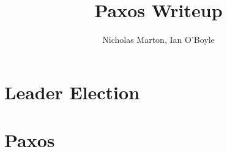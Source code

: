 \documentclass{article}
\begin{document}
	
	\title{Paxos Writeup}
	\author{Nicholas Marton, Ian O'Boyle}
	
	\maketitle
	
	\section{Leader Election}
	
	\section{Paxos}
	
\end{document}
